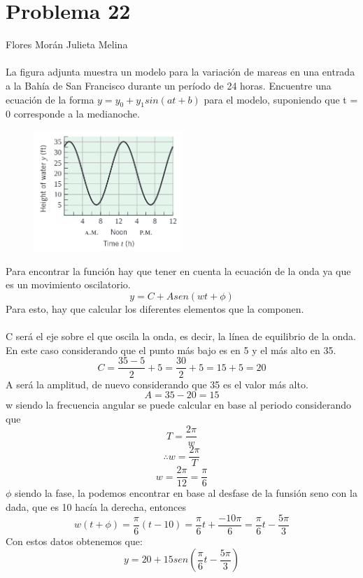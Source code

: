 \documentclass[12pt]{article}
\begin{document}
\section{Problema 22}
Flores Morán Julieta Melina\\
\\
La figura adjunta muestra un modelo para la variación de mareas en una entrada a la Bahía de San Francisco durante un período de 24 horas.
Encuentre una ecuación de la forma $y = y_0 + y_1 sin(at + b)$ para el
modelo, suponiendo que t = 0 corresponde a la medianoche.\\
\begin{figure}[h]
\centering
\includegraphics[width=0.5\textwidth]{img/prob22.png}
\end{figure}
Para encontrar la función hay que tener en cuenta la ecuación de la onda ya que es un movimiento oscilatorio.
\[
y = C + A sen (wt+\phi) 
\]
Para esto, hay que calcular los diferentes elementos que la componen. \\ \\
C será el eje sobre el que oscila la onda, es decir, la línea de equilibrio de la onda. En este caso considerando que el punto más bajo es en 5 y el más alto en 35.
\[
C = \frac{35-5}{2} + 5 = \frac{30}{2}+ 5 =15 + 5 = 20
\]
A será la amplitud, de nuevo considerando que 35 es el valor más alto.
\[
A = 35 - 20 = 15
\]
w siendo la frecuencia angular se puede calcular en base al periodo considerando que
\[
T=\frac{2\pi}{w}
\]
\[
\therefore w = \frac{2\pi}{T} 
\]
\[
 w = \frac{2\pi}{12} = \frac{\pi}{6}
\]
$\phi$ siendo la fase, la podemos encontrar en base al desfase de la funsión seno con la dada, que es 10 hacía la derecha, entonces
\[
 w(t+\phi)  = \frac{\pi}{6}(t-10) = \frac{\pi}{6}t+\frac{-10\pi}{6} = \frac{\pi}{6}t-\frac{5\pi}{3} 
\]
Con estos datos obtenemos que: 
\[
y = 20 + 15 sen (\frac{\pi}{6}t-\frac{5\pi}{3}) 
\]
\end{document}
